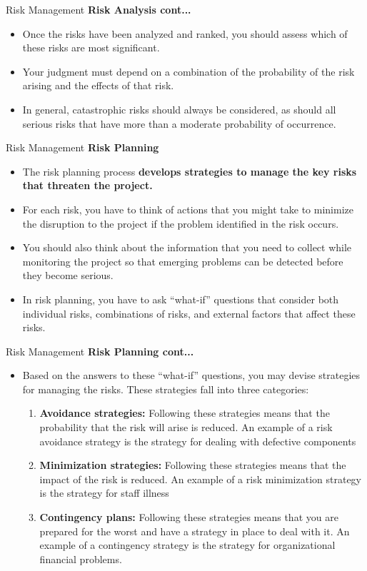 \documentclass{beamer}
\begin{document}
\begin{frame}{Risk Management}
	\textbf{Risk Analysis cont...}
	\begin{itemize}
		\item Once the risks have been analyzed and ranked, you should assess which of these risks are most 
		significant. 
		\item Your judgment must depend on a combination of the probability of the risk arising and the effects of 
		that risk. 
		\item In general, catastrophic risks should always be considered, as should all serious risks that have more 
		than a moderate probability of occurrence.
	\end{itemize}
\end{frame}
\begin{frame}{Risk Management}
	\textbf{Risk Planning}
	\begin{itemize}
		\item The risk planning process\textbf{ develops strategies to manage the key risks 
			that threaten the project.}
		\item For each risk, you have to think of actions that you might take to 
		minimize the disruption to the project if the problem identified in the 
		risk occurs. 
		\item You should also think about the information that you need to collect 
		while monitoring the project so that emerging problems can be 
		detected before they become serious.

		\item In risk planning, you have to ask “what-if” questions that consider both individual risks, combinations of 
		risks, and external factors that affect these risks.

	\end{itemize}
\end{frame}
\begin{frame}{Risk Management}
\textbf{Risk Planning cont...}
\begin{itemize}
	\item Based on the answers to these “what-if” questions, you may devise strategies for managing the risks. 
	These strategies fall into three categories:

	\begin{enumerate}
		\item \textbf{Avoidance strategies:} Following these strategies means that the probability that the risk will arise is 
		reduced. An example of a risk avoidance strategy is the strategy for dealing with defective 
		components
		\item \textbf{Minimization strategies:} Following these strategies means that the impact of the risk is reduced. 
		An example of a risk minimization strategy is the strategy for staff illness
		\item \textbf{Contingency plans:} Following these strategies means that you are prepared for the worst and have 
		a strategy in place to deal with it. An example of a contingency strategy is the strategy for 
		organizational financial problems.
	\end{enumerate}
\end{itemize}
\end{frame}
\end{document}
